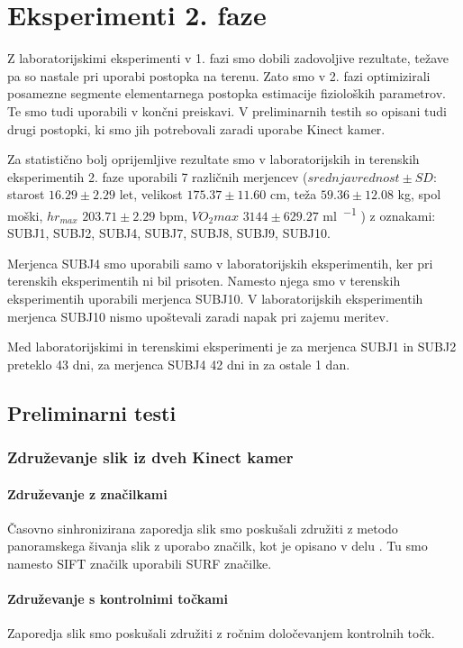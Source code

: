 \section{Eksperimenti 2. faze}
Z laboratorijskimi eksperimenti v 1. fazi smo dobili zadovoljive rezultate, težave pa so nastale pri uporabi postopka na terenu. Zato smo v 2. fazi optimizirali posamezne segmente elementarnega postopka estimacije fizioloških parametrov. Te smo tudi uporabili v končni preiskavi. V preliminarnih testih so opisani tudi drugi postopki, ki smo jih potrebovali zaradi uporabe Kinect kamer.

Za statistično bolj oprijemljive rezultate smo v laboratorijskih in terenskih eksperimentih 2. faze uporabili 7 različnih merjencev  ($srednja vrednost \pm SD$: starost $16.29 \pm 2.29$ let, velikost $175.37 \pm 11.60$ \si{\cm}, teža $59.36 \pm 12.08$ \si{\kg}, spol moški, $hr_{max}$ $203.71 \pm 2.29$ \si{bpm}, $VO_2max$ $3144 \pm 629.27$ \si{\ml\per\min} ) z oznakami: SUBJ1, SUBJ2, SUBJ4, SUBJ7, SUBJ8, SUBJ9, SUBJ10. 

Merjenca SUBJ4 smo uporabili samo v laboratorijskih eksperimentih, ker pri terenskih eksperimentih ni bil prisoten. Namesto njega smo v terenskih eksperimentih uporabili merjenca SUBJ10. V laboratorijskih eksperimentih merjenca SUBJ10 nismo upoštevali zaradi napak pri zajemu meritev.

Med laboratorijskimi in terenskimi eksperimenti je za merjenca SUBJ1 in SUBJ2 preteklo 43 dni, za merjenca SUBJ4 42 dni in za ostale 1 dan.  

\subsection{Preliminarni testi}
\subsubsection{Združevanje slik iz dveh Kinect kamer}\label{sec:zdruzevanje}

\paragraph{Združevanje z značilkami}
Časovno sinhronizirana zaporedja slik smo poskušali združiti z metodo panoramskega šivanja slik z uporabo značilk, kot je opisano v delu \cite{brown2007automatic}. Tu smo namesto SIFT značilk uporabili SURF značilke.


\paragraph{Združevanje s kontrolnimi točkami}
Zaporedja slik smo poskušali združiti z ročnim določevanjem kontrolnih točk.


